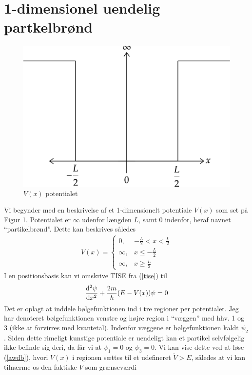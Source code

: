 \documentclass[12pt]{article}
\theoremstyle{definition}
\theoremstyle{remark}
\theoremstyle{definition}
\numberwithin{equation}{section}
\begin{document}
\section{1-dimensionel uendelig partkelbrønd}
\begin{figure}[!h]
    \centering
    \includegraphics[scale=0.16]{diagram-20201209.png}
    \caption{$V(x)$ potentialet}
    \label{fig:pot1}
\end{figure}
Vi begynder med en beskrivelse af et 1-dimensionelt potentiale $V(x)$ som set på Figur \ref{fig:pot1}. Potentialet er $\infty$ udenfor længden $L$, samt 0 indenfor, heraf navnet ``partikelbrønd''. Dette kan beskrives således
\begin{align}
    V(x) = \begin{cases}
    0, & -\frac{L}{2} < x < \frac{L}{2} \\
    \infty, & x \leq -\frac{L}{2} \\
    \infty, & x \geq \frac{L}{2}
    \end{cases}
\end{align}
I en positionsbasis kan vi omskrive TISE fra (\ref{tise}) til
\begin{align}
     \label{awdb}
    \dv[2]{\psi}{x}+\frac{2m}{\hbar}(E-V(x))\psi = 0
\end{align}
Det er oplagt at inddele bølgefunktionen ind i tre regioner per potentialet. Jeg har denoteret bølgefunktionen venstre og højre region i ``væggen'' med hhv. 1 og 3 (ikke at forvirres med kvantetal). Indenfor væggene er bølgefunktionen kaldt $\psi_2$. Siden dette rimeligt kunstige potentiale er uendeligt kan et partikel selvfølgelig ikke befinde sig deri, da får vi at $\psi_1=0$ og $\psi_3=0$. Vi kan vise dette ved at løse (\ref{awdb}), hvori $V(x)$ i regionen sættes til et udefineret $\tilde V>E$, således at vi kan tilnærme os den faktiske $V$ som grænseværdi
\end{document}
